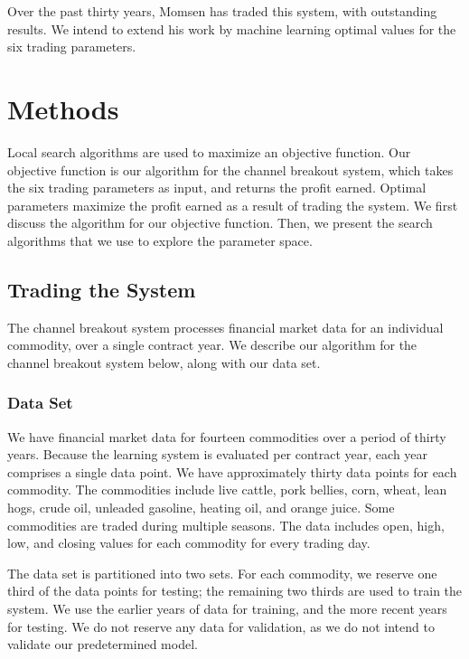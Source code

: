 \documentclass[12pt]{article}
\begin{document}
Over the past thirty years, Momsen has traded this system, with outstanding
results.  We intend to extend his work by machine learning optimal values for
the six trading parameters.

\section{Methods}

Local search algorithms are used to maximize an objective function. Our
objective function is our algorithm for the channel breakout system, which
takes the six trading parameters as input, and returns the profit
earned. Optimal parameters maximize the profit earned as a result of trading the
system. We first discuss the algorithm for our objective function. Then, we
present the search algorithms that we use to explore the parameter space.

\subsection{Trading the System}

The channel breakout system processes financial market data for an individual
commodity, over a single contract year.  We describe our algorithm for the
channel breakout system below, along with our data set.

\vspace{25pt}
\subsubsection{Data Set}

We have financial market data for fourteen commodities over a period of thirty
years.  Because the learning system is evaluated per contract year, each year
comprises a single data point.  We have approximately thirty data points for
each commodity.  The commodities include live cattle, pork bellies, corn,
wheat, lean hogs, crude oil, unleaded gasoline, heating oil, and orange juice.
Some commodities are traded during multiple seasons.  The data includes open,
high, low, and closing values for each commodity for every trading day.

The data set is partitioned into two sets. For each commodity, we reserve one
third of the data points for testing; the remaining two thirds are used to train
the system. We use the earlier years of data for training, and the more recent
years for testing. We do not reserve any data for validation, as we do not
intend to validate our predetermined model.
\end{document}
